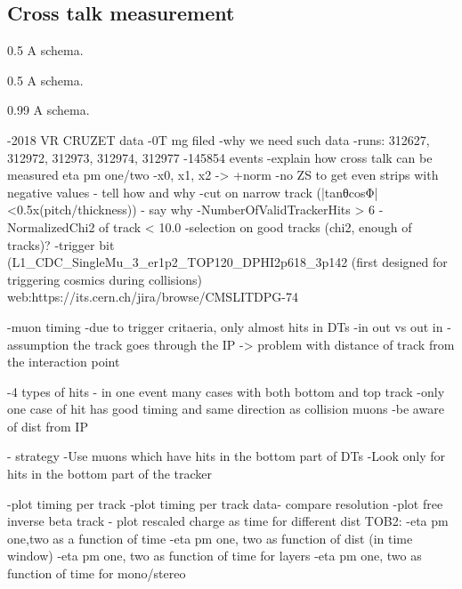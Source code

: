 \subsection{Cross talk  measurement~\label{sec:xtalk}}



                 {0.5}       %
                 { A schema. }

                 {0.5}       %
                 { A schema. }


                 {0.99}       %
                 { A schema. }

-2018 VR CRUZET data
-0T mg filed
-why we need such data
-runs: 312627, 312972, 312973, 312974, 312977
-145854 events
-explain how cross talk can be measured eta pm one/two
-x0, x1, x2 -> +norm
-no ZS to get even strips with negative values - tell how and why
-cut on narrow track (|tanθcosΦ|<0.5x(pitch/thickness)) - say why
-NumberOfValidTrackerHits > 6
-NormalizedChi2 of track < 10.0
-selection on good tracks (chi2, enough of tracks)?
-trigger bit (L1\_CDC\_SingleMu\_3\_er1p2\_TOP120\_DPHI2p618\_3p142 (first designed for triggering cosmics during collisions) web:https://its.cern.ch/jira/browse/CMSLITDPG-74 

-muon timing
	-due to trigger critaeria, only almost hits in DTs
	-in out vs out in
	-assumption the track goes through the IP -> problem with distance of track from the interaction point

-4 types of hits - in one event many cases with both bottom and top track
-only one case of hit has good timing and same direction as collision muons
-be aware of dist from IP

- strategy
	-Use muons which have hits in the bottom part of DTs
	-Look only for hits in the bottom part of the tracker

-plot timing per track %
-plot timing per track data- compare resolution %
-plot free inverse beta track %
- plot rescaled charge as time for different dist %
TOB2:
-eta pm one,two as a function of time %
-eta pm one, two as function of dist (in time window) %
-eta pm one, two as function of time for layers %
-eta pm one, two as function of time for mono/stereo %

